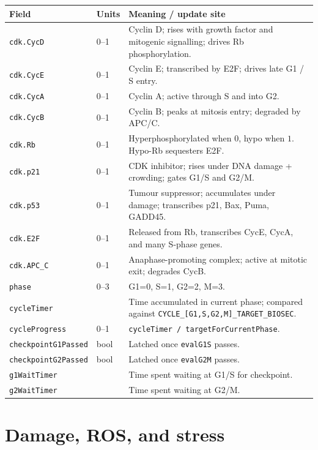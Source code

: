 \documentclass[11pt,letterpaper,twoside,openany]{book}
\newcommand{\code}[1]{\texttt{#1}}
\newcommand{\biosec}{\text{bio-s}}
\begin{document}
\begin{longtable}{p{3.3cm} p{2.2cm} p{7.5cm}}
\toprule
\textbf{Field} & \textbf{Units} & \textbf{Meaning / update site}\\ \midrule
\code{cdk.CycD}       & 0--1   & Cyclin D; rises with growth factor and mitogenic signalling; drives Rb phosphorylation.\\
\code{cdk.CycE}       & 0--1   & Cyclin E; transcribed by E2F; drives late G1 / S entry.\\
\code{cdk.CycA}       & 0--1   & Cyclin A; active through S and into G2.\\
\code{cdk.CycB}       & 0--1   & Cyclin B; peaks at mitosis entry; degraded by APC/C.\\
\code{cdk.Rb}         & 0--1   & Hyperphosphorylated when $0$, hypo when $1$. Hypo-Rb sequesters E2F.\\
\code{cdk.p21}        & 0--1   & CDK inhibitor; rises under DNA damage + crowding; gates G1/S and G2/M.\\
\code{cdk.p53}        & 0--1   & Tumour suppressor; accumulates under damage; transcribes p21, Bax, Puma, GADD45.\\
\code{cdk.E2F}        & 0--1   & Released from Rb, transcribes CycE, CycA, and many S-phase genes.\\
\code{cdk.APC\_C}     & 0--1   & Anaphase-promoting complex; active at mitotic exit; degrades CycB.\\
\code{phase}          & 0--3   & G1=0, S=1, G2=2, M=3.\\
\code{cycleTimer}     & \biosec & Time accumulated in current phase; compared against \code{CYCLE\_[G1,S,G2,M]\_TARGET\_BIOSEC}.\\
\code{cycleProgress}  & 0--1   & \code{cycleTimer / targetForCurrentPhase}.\\
\code{checkpointG1Passed} & bool & Latched once \code{evalG1S} passes.\\
\code{checkpointG2Passed} & bool & Latched once \code{evalG2M} passes.\\
\code{g1WaitTimer}    & \biosec & Time spent waiting at G1/S for checkpoint.\\
\code{g2WaitTimer}    & \biosec & Time spent waiting at G2/M.\\
\bottomrule
\end{longtable}

\section{Damage, ROS, and stress}
\end{document}
